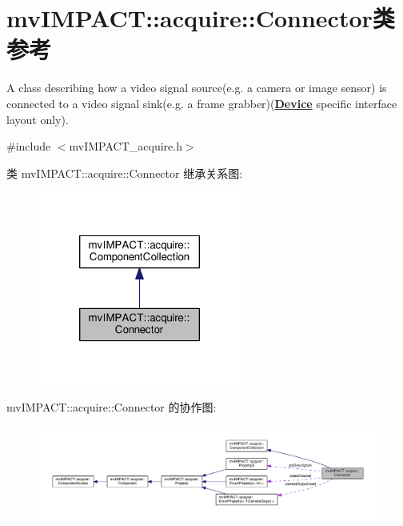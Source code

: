 \hypertarget{classmv_i_m_p_a_c_t_1_1acquire_1_1_connector}{\section{mv\+I\+M\+P\+A\+C\+T\+:\+:acquire\+:\+:Connector类 参考}
\label{classmv_i_m_p_a_c_t_1_1acquire_1_1_connector}
}


A class describing how a video signal source(e.\+g. a camera or image sensor) is connected to a video signal sink(e.\+g. a frame grabber)({\bfseries \hyperlink{classmv_i_m_p_a_c_t_1_1acquire_1_1_device}{Device}} specific interface layout only).  




{\ttfamily \#include $<$mv\+I\+M\+P\+A\+C\+T\+\_\+acquire.\+h$>$}



类 mv\+I\+M\+P\+A\+C\+T\+:\+:acquire\+:\+:Connector 继承关系图\+:
\nopagebreak
\begin{figure}[H]
\begin{center}
\leavevmode
\includegraphics[width=190pt]{classmv_i_m_p_a_c_t_1_1acquire_1_1_connector__inherit__graph}
\end{center}
\end{figure}


mv\+I\+M\+P\+A\+C\+T\+:\+:acquire\+:\+:Connector 的协作图\+:
\nopagebreak
\begin{figure}[H]
\begin{center}
\leavevmode
\includegraphics[width=350pt]{classmv_i_m_p_a_c_t_1_1acquire_1_1_connector__coll__graph}
\end{center}
\end{figure}
